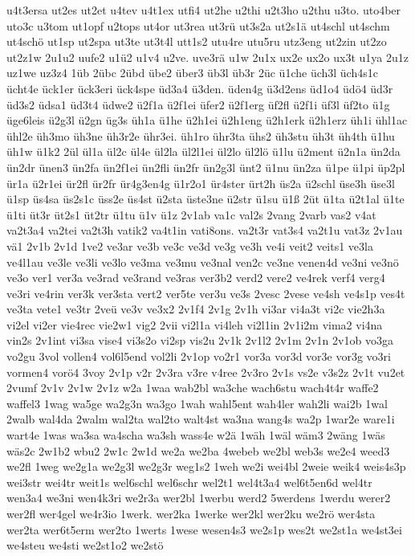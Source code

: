 {u4t3ersa
ut2es
ut2et
u4tev
u4t1ex
utfi4
ut2he
u2thi
u2t3ho
u2thu
u3to.
uto4ber
uto3c
u3tom
ut1opf
u2tops
ut4or
ut3rea
ut3rü
ut3s2a
ut2s1ä
ut4schl
ut4schm
ut4schö
ut1sp
ut2spa
ut3te
ut3t4l
utt1s2
utu4re
utu5ru
utz3eng
ut2zin
ut2zo
ut2z1w
2u1u2
uufe2
u1ü2
u1v4
u2ve.
uve3rä
u1w
2u1x
ux2e
ux2o
ux3t
u1ya
2u1z
uz1we
uz3z4
1üb
2übc
2übd
übe2
über3
üb3l
üb3r
2üc
ü1che
üch3l
üch4s1c
ücht4e
ück1er
ück3eri
ück4spe
üd3a4
ü3den.
üden4g
ü3d2ens
üd1o4
üdö4
üd3r
üd3s2
üdsa1
üd3t4
üdwe2
ü2f1a
ü2f1ei
üfer2
ü2f1erg
üf2fl
ü2f1i
üf3l
üf2to
ü1g
üge6leis
ü2g3l
ü2gn
üg3s
üh1a
ü1he
ü2h1ei
ü2h1eng
ü2h1erk
ü2h1erz
üh1i
ühl1ac
ühl2e
üh3mo
üh3ne
üh3r2e
ühr3ei.
üh1ro
ühr3ta
ühs2
üh3stu
üh3t
üh4th
ü1hu
üh1w
ü1k2
2ül
ül1a
ül2c
ül4e
ül2la
ül2l1ei
ül2lo
ül2lö
ü1lu
ü2ment
ü2n1a
ün2da
ün2dr
ünen3
ün2fa
ün2f1ei
ün2fli
ün2fr
ün2g3l
ünt2
ü1nu
ün2za
ü1pe
ü1pi
üp2pl
ür1a
ü2r1ei
ür2fl
ür2fr
ür4g3en4g
ü1r2o1
ür4ster
ürt2h
üs2a
ü2schl
üse3h
üse3l
ü1sp
üs4sa
üs2s1c
üss2e
üs4st
ü2sta
üste3ne
ü2str
ü1su
ü1ß
2üt
ü1ta
ü2t1al
ü1te
ü1ti
üt3r
üt2s1
üt2tr
ü1tu
ü1v
ü1z
2v1ab
va1c
val2s
2vang
2varb
vas2
v4at
va2t3a4
va2tei
va2t3h
vatik2
va4t1in
vati8ons.
va2t3r
vat3s4
va2t1u
vat3z
2v1au
vä1
2v1b
2v1d
1ve2
ve3ar
ve3b
ve3c
ve3d
ve3g
ve3h
ve4i
veit2
veits1
ve3la
ve4l1au
ve3le
ve3li
ve3lo
ve3ma
ve3mu
ve3nal
ven2c
ve3ne
venen4d
ve3ni
ve3nö
ve3o
ver1
ver3a
ve3rad
ve3rand
ve3ras
ver3b2
verd2
vere2
ve4rek
verf4
verg4
ve3ri
ve4rin
ver3k
ver3sta
vert2
ver5te
ver3u
ve3s
2vesc
2vese
ve4sh
ve4s1p
ves4t
ve3ta
vete1
ve3tr
2veü
ve3v
ve3x2
2v1f4
2v1g
2v1h
vi3ar
vi4a3t
vi2c
vie2h3a
vi2el
vi2er
vie4rec
vie2w1
vig2
2vii
vi2l1a
vi4leh
vi2l1in
2v1i2m
vima2
vi4na
vin2s
2v1int
vi3sa
vise4
vi3s2o
vi2sp
vis2u
2v1k
2v1l2
2v1m
2v1n
2v1ob
vo3ga
vo2gu
3vol
vollen4
vol6l5end
vol2li
2v1op
vo2r1
vor3a
vor3d
vor3e
vor3g
vo3ri
vormen4
vorö4
3voy
2v1p
v2r
2v3ra
v3re
v4ree
2v3ro
2v1s
vs2e
v3s2z
2v1t
vu2et
2vumf
2v1v
2v1w
2v1z
w2a
1waa
wab2bl
wa3che
wach6stu
wach4t4r
waffe2
waffel3
1wag
wa5ge
wa2g3n
wa3go
1wah
wahl5ent
wah4ler
wah2li
wai2b
1wal
2walb
wal4da
2walm
wal2ta
wal2to
walt4st
wa3na
wang4s
wa2p
1war2e
ware1i
wart4e
1was
wa3sa
wa4scha
wa3sh
wass4e
w2ä
1wäh
1wäl
wäm3
2wäng
1wäs
wäs2c
2w1b2
wbu2
2w1c
2w1d
we2a
we2ba
4webeb
we2bl
web3s
we2e4
weed3
we2fl
1weg
we2g1a
we2g3l
we2g3r
weg1s2
1weh
we2i
wei4bl
2weie
weik4
weis4s3p
wei3str
wei4tr
weit1s
wel6schl
wel6schr
wel2t1
wel4t3a4
wel6t5en6d
wel4tr
wen3a4
we3ni
wen4k3ri
we2r3a
wer2bl
1werbu
werd2
5werdens
1werdu
werer2
wer2fl
wer4gel
we4r3io
1werk.
wer2ka
1werke
wer2kl
wer2ku
we2rö
wer4sta
wer2ta
wer6t5erm
wer2to
1werts
1wese
wesen4s3
we2s1p
wes2t
we2st1a
we4st3ei
we4steu
we4sti
we2st1o2
we2stö
}
